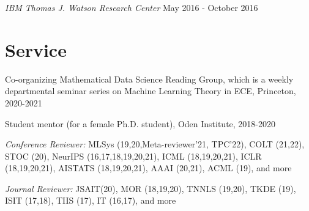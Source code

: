 \documentclass[margin, 10pt]{res} %
\begin{document}
\begin{resume}
{\sl IBM Thomas J. Watson Research Center} \hfill May 2016 - October 2016



\section{Service}
Co-organizing Mathematical Data Science Reading Group, which is a weekly departmental seminar series on Machine Learning Theory in ECE, Princeton, 2020-2021 

Student mentor (for a female Ph.D. student),  Oden Institute, 2018-2020

{\sl Conference Reviewer:} MLSys (19,20,Meta-reviewer'21, TPC'22), COLT (21,22), STOC (20), NeurIPS (16,17,18,19,20,21), ICML (18,19,20,21), ICLR (18,19,20,21), 
AISTATS (18,19,20,21), AAAI (20,21), ACML (19), and more

{\sl Journal Reviewer:} JSAIT(20), MOR (18,19,20), TNNLS (19,20), TKDE (19), ISIT (17,18), TIIS (17), 
IT (16,17), and more





\end{resume}
\end{document}

